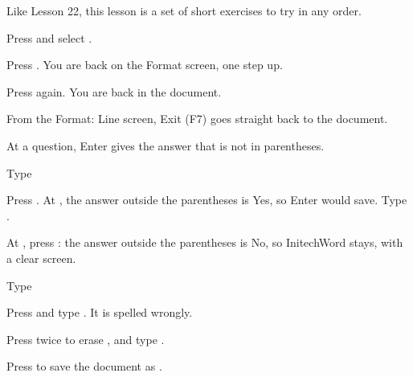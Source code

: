 Like Lesson 22, this lesson is a set of short exercises to try in any order.

\begin{WPSteps}
\item Press  and select .
\item Press .  You are back on the Format screen, one step
up.
\item Press  again.  You are back in the document.
\end{WPSteps}
\begin{Aside}From the Format: Line screen, Exit (F7) goes straight back to the
document.\end{Aside}

At a question, Enter gives the answer that is not in parentheses.
\begin{WPSteps}
\item Type 
\item Press .  At , the answer
outside the parentheses is Yes, so Enter would save.  Type .
\item At , press : the answer outside
the parentheses is No, so InitechWord stays, with a clear screen.
\end{WPSteps}

\begin{WPSteps}
\item Type 
\item Press  and type .  It is spelled
wrongly.
\item Press  twice to erase ,
and type .
\end{WPSteps}
\begin{WPSteps}[resume]
\item Press  to save the document as .
\end{WPSteps}

